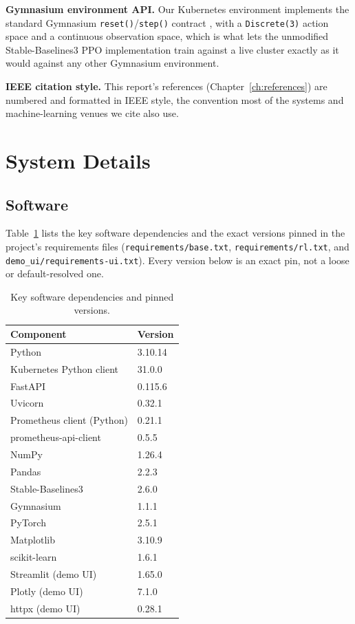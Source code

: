\textbf{Gymnasium environment API.} Our Kubernetes environment implements
the standard Gymnasium \texttt{reset()}/\texttt{step()} contract
\cite{towers2024gymnasium}, with a \texttt{Discrete(3)} action space and a
continuous observation space, which is what lets the unmodified
Stable-Baselines3 PPO implementation train against a live cluster exactly
as it would against any other Gymnasium environment.

\textbf{IEEE citation style.} This report's references (Chapter~\ref{ch:references})
are numbered and formatted in IEEE style, the convention most of the
systems and machine-learning venues we cite also use.

\section{System Details}
\label{sec:system-details}

\subsection{Software}
\label{sec:software-stack}

Table~\ref{tab:software-stack} lists the key software dependencies and the
exact versions pinned in the project's requirements files
(\texttt{requirements/\allowbreak \allowbreak base.txt}, \texttt{requirements/\allowbreak \allowbreak rl.txt}, and
\texttt{demo\_\allowbreak ui/\allowbreak \allowbreak requirements-\allowbreak ui.txt}). Every version below is an exact
pin, not a loose or default-resolved one.

\begin{table}[H]
\centering
\caption[Software dependencies]{Key software dependencies and pinned versions.}
\label{tab:software-stack}
\begin{tabular}{ll}
\toprule
Component & Version \\
\midrule
Python & 3.10.14 \\
Kubernetes Python client & 31.0.0 \\
FastAPI & 0.115.6 \\
Uvicorn & 0.32.1 \\
Prometheus client (Python) & 0.21.1 \\
prometheus-api-client & 0.5.5 \\
NumPy & 1.26.4 \\
Pandas & 2.2.3 \\
Stable-Baselines3 & 2.6.0 \\
Gymnasium & 1.1.1 \\
PyTorch & 2.5.1 \\
Matplotlib & 3.10.9 \\
scikit-learn & 1.6.1 \\
Streamlit (demo UI) & 1.65.0 \\
Plotly (demo UI) & 7.1.0 \\
httpx (demo UI) & 0.28.1 \\
\bottomrule
\end{tabular}
\end{table}

